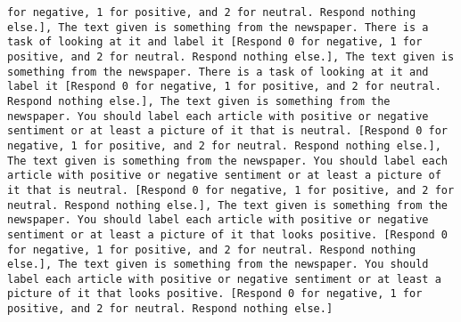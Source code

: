 \begin{lstlisting}[label=lst:poor_performing_prompts]
for negative, 1 for positive, and 2 for neutral. Respond nothing else.], The text given is something from the newspaper. There is a task of looking at it and label it [Respond 0 for negative, 1 for positive, and 2 for neutral. Respond nothing else.], The text given is something from the newspaper. There is a task of looking at it and label it [Respond 0 for negative, 1 for positive, and 2 for neutral. Respond nothing else.], The text given is something from the newspaper. You should label each article with positive or negative sentiment or at least a picture of it that is neutral. [Respond 0 for negative, 1 for positive, and 2 for neutral. Respond nothing else.], The text given is something from the newspaper. You should label each article with positive or negative sentiment or at least a picture of it that is neutral. [Respond 0 for negative, 1 for positive, and 2 for neutral. Respond nothing else.], The text given is something from the newspaper. You should label each article with positive or negative sentiment or at least a picture of it that looks positive. [Respond 0 for negative, 1 for positive, and 2 for neutral. Respond nothing else.], The text given is something from the newspaper. You should label each article with positive or negative sentiment or at least a picture of it that looks positive. [Respond 0 for negative, 1 for positive, and 2 for neutral. Respond nothing else.]

\end{lstlisting}

